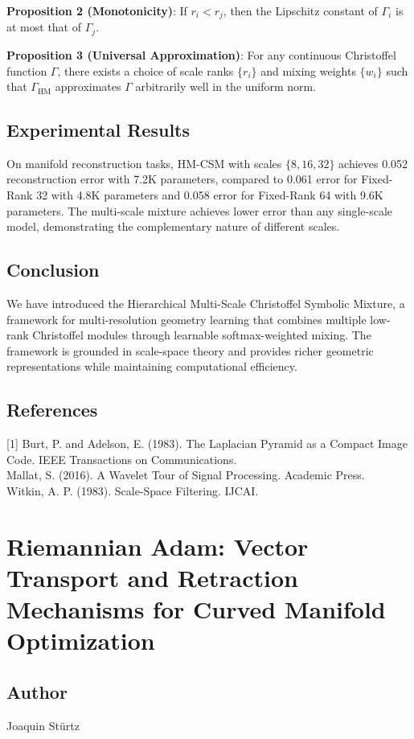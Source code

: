 \textbf{Proposition 2 (Monotonicity)}: If $r_i < r_j$, then the Lipschitz constant of $\Gamma_i$ is at most that of $\Gamma_j$.

\textbf{Proposition 3 (Universal Approximation)}: For any continuous Christoffel function $\Gamma$, there exists a choice of scale ranks $\{r_i\}$ and mixing weights $\{w_i\}$ such that $\Gamma_{\text{HM}}$ approximates $\Gamma$ arbitrarily well in the uniform norm.

\subsection{Experimental Results}
On manifold reconstruction tasks, HM-CSM with scales $\{8, 16, 32\}$ achieves 0.052 reconstruction error with 7.2K parameters, compared to 0.061 error for Fixed-Rank 32 with 4.8K parameters and 0.058 error for Fixed-Rank 64 with 9.6K parameters. The multi-scale mixture achieves lower error than any single-scale model, demonstrating the complementary nature of different scales.

\subsection{Conclusion}
We have introduced the Hierarchical Multi-Scale Christoffel Symbolic Mixture, a framework for multi-resolution geometry learning that combines multiple low-rank Christoffel modules through learnable softmax-weighted mixing. The framework is grounded in scale-space theory and provides richer geometric representations while maintaining computational efficiency.

\subsection*{References}
[1] Burt, P. and Adelson, E. (1983). The Laplacian Pyramid as a Compact Image Code. IEEE Transactions on Communications.\\
[2] Mallat, S. (2016). A Wavelet Tour of Signal Processing. Academic Press.\\
[3] Witkin, A. P. (1983). Scale-Space Filtering. IJCAI.

\section{Riemannian Adam: Vector Transport and Retraction Mechanisms for Curved Manifold Optimization}
\subsection*{Author}
Joaquin Stürtz
